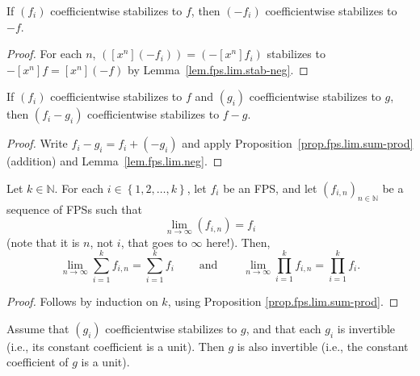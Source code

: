 \begin{lemma}
\label{lem.fps.lim.neg}
\leanhelper
\leanok
If $(f_i)$ coefficientwise stabilizes to $f$, then $(-f_i)$ coefficientwise
stabilizes to $-f$.
\end{lemma}

\begin{proof}
\leanok
For each $n$, $([x^n](-f_i)) = (-[x^n]f_i)$ stabilizes to $-[x^n]f = [x^n](-f)$
by Lemma~\ref{lem.fps.lim.stab-neg}.
\end{proof}

\begin{lemma}
\label{lem.fps.lim.sub}
\leanhelper
\leanok
If $(f_i)$ coefficientwise stabilizes to $f$ and $(g_i)$ coefficientwise
stabilizes to $g$, then $(f_i - g_i)$ coefficientwise stabilizes to $f - g$.
\end{lemma}

\begin{proof}
\leanok
Write $f_i - g_i = f_i + (-g_i)$ and apply Proposition~\ref{prop.fps.lim.sum-prod}
(addition) and Lemma~\ref{lem.fps.lim.neg}.
\end{proof}

\begin{corollary}
\label{cor.fps.lim.sum-prod-k}
\leantarget
\leanok
Let $k\in\mathbb{N}$. For each $i\in\left\{
1,2,\ldots,k\right\}  $, let $f_{i}$ be an FPS, and let $\left(
f_{i,n}\right)  _{n\in\mathbb{N}}$ be a sequence of FPSs such that%
\[
\lim\limits_{n\rightarrow\infty}\left(  f_{i,n}\right)  =f_{i}%
\]
(note that it is $n$, not $i$, that goes to $\infty$ here!). Then,%
\[
\lim\limits_{n\rightarrow\infty}\sum_{i=1}^{k}f_{i,n}=\sum_{i=1}^{k}%
f_{i}\ \ \ \ \ \ \ \ \ \ \text{and}\ \ \ \ \ \ \ \ \ \ \lim
\limits_{n\rightarrow\infty}\prod_{i=1}^{k}f_{i,n}=\prod_{i=1}^{k}f_{i}.
\]
\end{corollary}

\begin{proof}
\leanok
Follows by induction on $k$, using Proposition \ref{prop.fps.lim.sum-prod}.
\end{proof}

\begin{lemma}
\label{lem.fps.lim.isUnit-constantCoeff}
\leanhelper
\leanok
Assume that $(g_i)$ coefficientwise stabilizes to $g$, and that each $g_i$ is
invertible (i.e., its constant coefficient is a unit). Then $g$ is also
invertible (i.e., the constant coefficient of $g$ is a unit).
\end{lemma}

